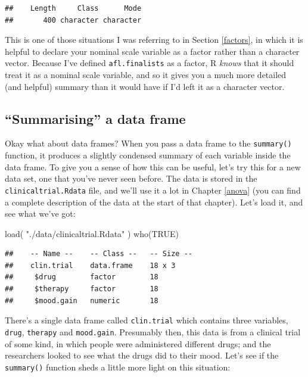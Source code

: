 \documentclass[
]{book}
\newenvironment{Shaded}{\begin{snugshade}}{\end{snugshade}}
\newcommand{\ConstantTok}[1]{\textcolor[rgb]{0.00,0.00,0.00}{#1}}
\newcommand{\FunctionTok}[1]{\textcolor[rgb]{0.00,0.00,0.00}{#1}}
\newcommand{\NormalTok}[1]{#1}
\newcommand{\StringTok}[1]{\textcolor[rgb]{0.31,0.60,0.02}{#1}}
\begin{document}
\begin{verbatim}
##    Length     Class      Mode 
##       400 character character
\end{verbatim}

This is one of those situations I was referring to in Section \ref{factors}, in which it is helpful to declare your nominal scale variable as a factor rather than a character vector. Because I've defined \texttt{afl.finalists} as a factor, R \emph{knows} that it should treat it as a nominal scale variable, and so it gives you a much more detailed (and helpful) summary than it would have if I'd left it as a character vector.

\hypertarget{summarising-a-data-frame}{%
\subsection{``Summarising'' a data frame}\label{summarising-a-data-frame}}

Okay what about data frames? When you pass a data frame to the \texttt{summary()} function, it produces a slightly condensed summary of each variable inside the data frame. To give you a sense of how this can be useful, let's try this for a new data set, one that you've never seen before. The data is stored in the \texttt{clinicaltrial.Rdata} file, and we'll use it a lot in Chapter \ref{anova} (you can find a complete description of the data at the start of that chapter). Let's load it, and see what we've got:

\begin{Shaded}
\begin{Highlighting}[]
\FunctionTok{load}\NormalTok{( }\StringTok{"./data/clinicaltrial.Rdata"}\NormalTok{ )}
\FunctionTok{who}\NormalTok{(}\ConstantTok{TRUE}\NormalTok{)}
\end{Highlighting}
\end{Shaded}

\begin{verbatim}
##    -- Name --    -- Class --   -- Size --
##    clin.trial    data.frame    18 x 3    
##     $drug        factor        18        
##     $therapy     factor        18        
##     $mood.gain   numeric       18
\end{verbatim}

There's a single data frame called \texttt{clin.trial} which contains three variables, \texttt{drug}, \texttt{therapy} and \texttt{mood.gain}. Presumably then, this data is from a clinical trial of some kind, in which people were administered different drugs; and the researchers looked to see what the drugs did to their mood. Let's see if the \texttt{summary()} function sheds a little more light on this situation:
\end{document}
